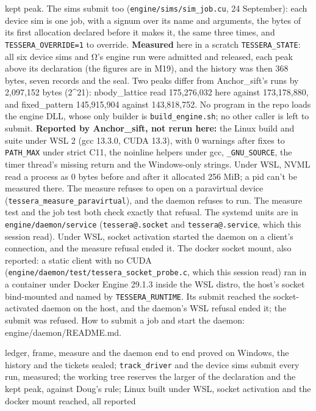 \begin{description}
kept peak. The sims submit too (\texttt{engine/\allowbreak{}sims/\allowbreak{}sim\_\allowbreak{}job.\allowbreak{}cu}, 24 September): each device sim is one job, with a signum over its name and arguments, the bytes of its first allocation declared before it makes it, the same three times, and \texttt{TESSERA\_\allowbreak{}OVERRIDE=1} to override. \textbf{Measured} here in a scratch \texttt{TESSERA\_\allowbreak{}STATE}: all six device sims and Ω's engine run were admitted and released, each peak above its declaration (the figures are in M19), and the history was then 368 bytes, seven records and the seal. Two peaks differ from Anchor\_\allowbreak{}sift's runs by 2,097,152 bytes (2\textasciicircum{}21): nbody\_\allowbreak{}lattice read 175,276,032 here against 173,178,880, and fixed\_\allowbreak{}pattern 145,915,904 against 143,818,752. No program in the repo loads the engine DLL, whose only builder is \texttt{build\_\allowbreak{}engine.\allowbreak{}sh}; no other caller is left to submit. \textbf{Reported by Anchor\_\allowbreak{}sift, not rerun here:} the Linux build and suite under WSL 2 (gcc 13.3.0, CUDA 13.3), with 0 warnings after fixes to \texttt{PATH\_\allowbreak{}MAX} under strict C11, the noinline helpers under gcc, \texttt{\_\allowbreak{}GNU\_\allowbreak{}SOURCE}, the timer thread's missing return and the Windows-only strings. Under WSL, NVML read a process as 0 bytes before and after it allocated 256 MiB; a pid can't be measured there. The measure refuses to open on a paravirtual device (\texttt{tessera\_\allowbreak{}measure\_\allowbreak{}paravirtual}), and the daemon refuses to run. The measure test and the job test both check exactly that refusal. The systemd units are in \texttt{engine/\allowbreak{}daemon/\allowbreak{}service} (\texttt{tessera@.\allowbreak{}socket} and \texttt{tessera@.\allowbreak{}service}, which this session read). Under WSL, socket activation started the daemon on a client's connection, and the measure refusal ended it. The docker socket mount, also reported: a static client with no CUDA (\texttt{engine/\allowbreak{}daemon/\allowbreak{}test/\allowbreak{}tessera\_\allowbreak{}socket\_\allowbreak{}probe.\allowbreak{}c}, which this session read) ran in a container under Docker Engine 29.1.3 inside the WSL distro, the host's socket bind-mounted and named by \texttt{TESSERA\_\allowbreak{}RUNTIME}. Its submit reached the socket-activated daemon on the host, and the daemon's WSL refusal ended it; the submit was refused. How to submit a job and start the daemon: engine/daemon/README.md.
\item[{status}] ledger, frame, measure and the daemon end to end proved on Windows, the history and the tickets sealed; \texttt{track\_\allowbreak{}driver} and the device sims submit every run, measured; the working tree reserves the larger of the declaration and the kept peak, against Doug's rule; Linux built under WSL, socket activation and the docker mount reached, all reported

\end{description}
